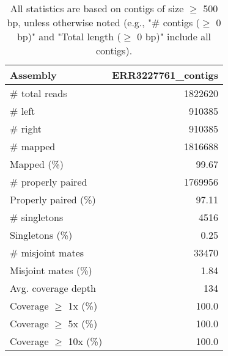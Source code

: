 \documentclass[12pt,a4paper]{article}
\begin{document}
\begin{table}[ht]
\begin{center}
\caption{All statistics are based on contigs of size $\geq$ 500 bp, unless otherwise noted (e.g., "\# contigs ($\geq$ 0 bp)" and "Total length ($\geq$ 0 bp)" include all contigs).}
\begin{tabular}{|l*{1}{|r}|}
\hline
Assembly & ERR3227761\_contigs \\ \hline
\# total reads & 1822620 \\ \hline
\# left & 910385 \\ \hline
\# right & 910385 \\ \hline
\# mapped & 1816688 \\ \hline
Mapped (\%) & 99.67 \\ \hline
\# properly paired & 1769956 \\ \hline
Properly paired (\%) & 97.11 \\ \hline
\# singletons & 4516 \\ \hline
Singletons (\%) & 0.25 \\ \hline
\# misjoint mates & 33470 \\ \hline
Misjoint mates (\%) & 1.84 \\ \hline
Avg. coverage depth & 134 \\ \hline
Coverage $\geq$ 1x (\%) & 100.0 \\ \hline
Coverage $\geq$ 5x (\%) & 100.0 \\ \hline
Coverage $\geq$ 10x (\%) & 100.0 \\ \hline
\end{tabular}
\end{center}
\end{table}
\end{document}
